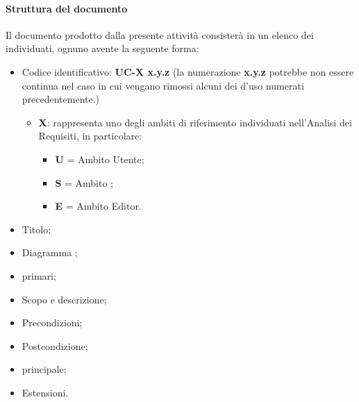 			\paragraph*{Struttura del documento}
			Il documento prodotto dalla presente attivit\`a consister\`a in un elenco dei  individuati, 
                        ognuno avente la seguente forma:
				\begin{itemize}
				\item Codice identificativo: \textbf{UC-{X} x.y.z} (la numerazione \textbf{x.y.z} potrebbe non essere continua nel caso in cui vengano
                                      rimossi alcuni dei  d'uso numerati precedentemente.)
						\begin{itemize}
						\item \textbf{X}: rappresenta uno degli ambiti di riferimento individuati
						nell'Analisi dei Requisiti, in particolare:
							\begin{itemize}
							\item [] \textbf{U} = Ambito Utente;
							\item [] \textbf{S} = Ambito ;
							\item [] \textbf{E} = Ambito Editor. 
							\end{itemize}
						\end{itemize}
				\item Titolo;
				\item Diagramma ;
				\item {} primari;
				\item Scopo e descrizione;
				\item Precondizioni;
				\item Postcondizione;
				\item {} principale;
                                \item Estensioni.
				\end{itemize}

